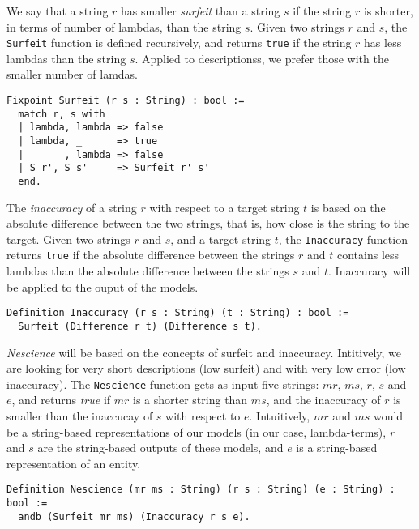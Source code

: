 We say that a string $r$ has smaller \emph{surfeit} than a string $s$ if the string $r$ is shorter, in terms of number of lambdas, than the string $s$. Given two strings $r$ and $s$, the \texttt{Surfeit} function is defined recursively, and returns \texttt{true} if the string $r$ has less lambdas than the string $s$.  Applied to descriptionss, we prefer those with the smaller number of lamdas.

\begin{sourcecode}
{\scriptsize \begin{verbatim}
Fixpoint Surfeit (r s : String) : bool :=
  match r, s with
  | lambda, lambda => false
  | lambda, _      => true
  | _     , lambda => false
  | S r', S s'     => Surfeit r' s' 
  end.
\end{verbatim}}
\end{sourcecode}

The \emph{inaccuracy} of a string $r$ with respect to a target string $t$ is based on the absolute difference between the two strings, that is, how close is the string to the target. Given two strings $r$ and $s$, and a target string $t$, the \texttt{Inaccuracy} function returns \texttt{true} if the absolute difference between the strings $r$ and $t$ contains less lambdas than the absolute difference between the strings $s$ and $t$. Inaccuracy will be applied to the ouput of the models.

\begin{sourcecode}
{\scriptsize \begin{verbatim}
Definition Inaccuracy (r s : String) (t : String) : bool :=
  Surfeit (Difference r t) (Difference s t).\end{verbatim}}
\end{sourcecode}

\emph{Nescience} will be based on the concepts of surfeit and inaccuracy. Intitively, we are looking for very short descriptions (low surfeit) and with very low error (low inaccuracy). The \texttt{Nescience} function gets as input five strings: $mr$, $ms$, $r$, $s$ and $e$, and returns \emph{true} if $mr$ is a shorter string than $ms$, and the inaccuracy of $r$ is smaller than the inaccucay of $s$ with respect to $e$. Intuitively, $mr$ and $ms$ would be a string-based representations of our models (in our case, lambda-terms), $r$ and $s$ are the string-based outputs of these models, and $e$ is a string-based representation of an entity.

\begin{sourcecode}
{\scriptsize \begin{verbatim}
Definition Nescience (mr ms : String) (r s : String) (e : String) : bool :=
  andb (Surfeit mr ms) (Inaccuracy r s e).
\end{verbatim}}
\end{sourcecode}

